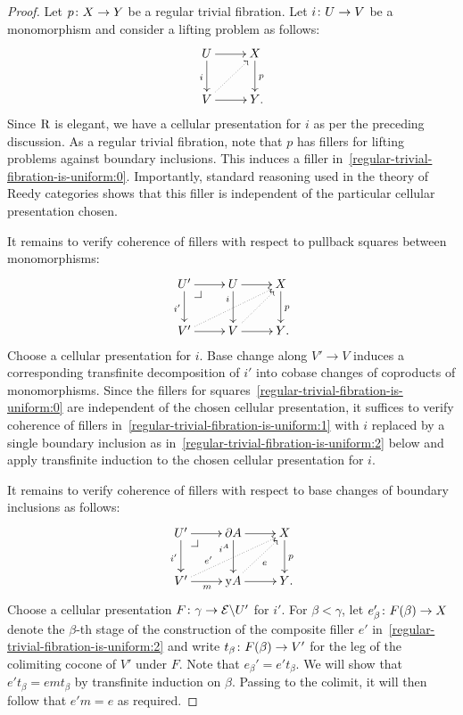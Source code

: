 \documentclass[reqno,10pt,a4paper,oneside,draft]{amsart}
\begin{document}
\begin{proof} Let $p \colon X \to Y$ be a regular trivial fibration.
Let $i \colon U \to V$ be a monomorphism and consider a lifting problem as follows:
\begin{equation} \label{regular-trivial-fibration-is-uniform:0}
\xycenter{
  U
  \ar[d]_{i}
  \ar[r]
&
  X
  \ar[d]^{p}
\\
  V
  \ar[r]
  \ar@{.>}[ur]
&
  Y
\rlap{.}
}
\end{equation}
Since $\mathrm{R}$ is elegant, we have a cellular presentation for $i$ as per the preceding discussion.
As a regular trivial fibration, note that $p$ has fillers for lifting problems against boundary inclusions.
This induces a filler in~\eqref{regular-trivial-fibration-is-uniform:0}.
Importantly, standard reasoning used in the theory of Reedy categories shows that this filler is independent of the particular cellular presentation chosen.

It remains to verify coherence of fillers with respect to pullback squares between monomorphisms:
\begin{equation} \label{regular-trivial-fibration-is-uniform:1}
\xycenter{
  U'
  \ar[d]_{i'}
  \ar[r]
  \pullback{dr}
&
  U
  \ar[d]_(0.3){i}
  \ar[r]
&
  X
  \ar[d]^{p}
\\
  V'
  \ar[r]
  \ar@{.>}[urr]
&
  V
  \ar[r]
  \ar@{.>}[ur]
&
  Y
\rlap{.}}
\end{equation}
Choose a cellular presentation for $i$.
Base change along $V' \to V$ induces a corresponding transfinite decomposition of $i'$ into cobase changes of coproducts of monomorphisms.
Since the fillers for squares~\eqref{regular-trivial-fibration-is-uniform:0} are independent of the chosen cellular presentation, it suffices to verify coherence of fillers in~\eqref{regular-trivial-fibration-is-uniform:1} with $i$ replaced by a single boundary inclusion as in~\eqref{regular-trivial-fibration-is-uniform:2} below and apply transfinite induction to the chosen cellular presentation for $i$.

It remains to verify coherence of fillers with respect to base changes of boundary inclusions as follows:
\begin{equation} \label{regular-trivial-fibration-is-uniform:2}
\xycenter{
  U'
  \ar[d]_{i'}
  \ar[r]
  \pullback{dr}
&
  \partial A
  \ar[d]_(0.3){i^A}
  \ar[r]
&
  X
  \ar[d]^{p}
\\
  V'
  \ar[r]_{m}
  \ar@{.>}[urr]^(0.3){e'}
&
  \yon A
  \ar[r]
  \ar@{.>}[ur]_{e}
&
  Y
\rlap{.}}
\end{equation}
Choose a cellular presentation $F \colon \gamma \to \mathcal{E} \backslash U'$ for $i'$.
For $\beta < \gamma$, let $e_{\beta}' \colon F(\beta) \to X$ denote the $\beta$-th stage of the construction of the composite filler $e'$ in~\eqref{regular-trivial-fibration-is-uniform:2} and write $t_{\beta} \colon F(\beta) \to V'$ for the leg of the colimiting cocone of $V'$ under $F$.
Note that $e_{\beta}' = e' t_{\beta}$.
We will show that $e' t_{\beta} = e m t_{\beta}$ by transfinite induction on $\beta$.
Passing to the colimit, it will then follow that $e' m = e$ as required.


\end{proof}
\end{document}
